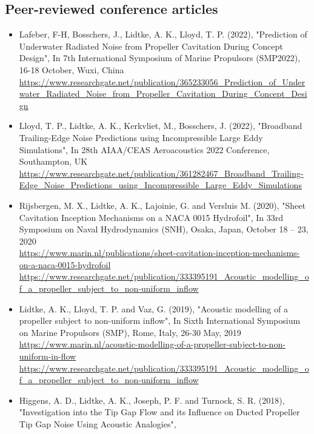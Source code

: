\documentclass[a4paper,10pt]{article}
\begin{document}
\subsection{Peer-reviewed conference articles}
%
\begin{itemize}
%
\item Lafeber, F-H, Bosschers, J., Lidtke, A. K., Lloyd, T. P. (2022),
	"Prediction of Underwater Radiated Noise from Propeller Cavitation During Concept Design",
	In 7th International Symposium of Marine Propulsors (SMP2022), 16-18 October, Wuxi, China
	\cite{lafeber_prediction_2022}
	\\ \url{https://www.researchgate.net/publication/365233056_Prediction_of_Underwater_Radiated_Noise_from_Propeller_Cavitation_During_Concept_Design}
%
\item Lloyd, T. P., Lidtke, A. K., Kerkvliet, M.,  Bosschers, J. (2022),
	"Broadband Trailing-Edge Noise Predictions using Incompressible Large Eddy Simulations",
	In 28th AIAA/CEAS Aeroacoustics 2022 Conference, Southampton, UK
	\cite{lloyd_broadband_2022}
	\\ \url{https://www.researchgate.net/publication/361282467_Broadband_Trailing-Edge_Noise_Predictions_using_Incompressible_Large_Eddy_Simulations}
%
\item Rijsbergen, M. X., Lidtke, A. K., Lajoinie, G. and Versluis M. (2020),
	"Sheet Cavitation Inception Mechanisms on a NACA 0015 Hydrofoil",
	In 33rd Symposium on Naval Hydrodynamics (SNH), Osaka, Japan, October 18 – 23, 2020
	\cite{Rijsbergen2020}
	\\ \url{https://www.marin.nl/publications/sheet-cavitation-inception-mechanisms-on-a-naca-0015-hydrofoil}
	\\ \url{https://www.researchgate.net/publication/333395191\_Acoustic\_modelling\_of\_a\_propeller\_subject\_to\_non-uniform\_inflow}
%
\item Lidtke, A. K., Lloyd, T. P. and Vaz, G. (2019),
	"Acoustic modelling of a propeller subject to non-uniform inflow",
	In Sixth International Symposium on Marine Propulsors (SMP), Rome, Italy, 26-30 May, 2019
	\cite{Lidtke2019a}
	\\ \url{https://www.marin.nl/acoustic-modelling-of-a-propeller-subject-to-non-uniform-in-flow}
	\\ \url{https://www.researchgate.net/publication/333395191\_Acoustic\_modelling\_of\_a\_propeller\_subject\_to\_non-uniform\_inflow}
%
\item Higgens, A. D., Lidtke, A. K., Joseph, P. F. and Turnock, S. R. (2018),
	"Investigation into the Tip Gap Flow and its Influence on Ducted Propeller Tip Gap Noise Using Acoustic Analogies",

\end{itemize}
\end{document}
